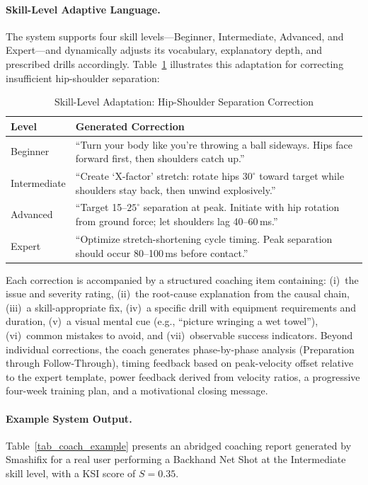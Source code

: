 \documentclass[pdflatex,sn-mathphys-num]{sn-jnl}
\theoremstyle{thmstyleone}%
\theoremstyle{thmstyletwo}%
\theoremstyle{thmstylethree}%
\begin{document}
\paragraph{Skill-Level Adaptive Language.}
The system supports four skill levels---Beginner, Intermediate, Advanced, and Expert---and dynamically adjusts its vocabulary, explanatory depth, and prescribed drills accordingly. Table~\ref{tab_skill_adapt} illustrates this adaptation for correcting insufficient hip-shoulder separation:

\begin{table}[h]
\caption{Skill-Level Adaptation: Hip-Shoulder Separation Correction}\label{tab_skill_adapt}
\centering
\small
\setlength{\tabcolsep}{4pt}
\renewcommand{\arraystretch}{1.3}
\begin{tabular}{|l|p{10.5cm}|}
\hline
\textbf{Level} & \textbf{Generated Correction} \\
\hline
Beginner & ``Turn your body like you're throwing a ball sideways. Hips face forward first, then shoulders catch up.'' \\
\hline
Intermediate & ``Create `X-factor' stretch: rotate hips $30^{\circ}$ toward target while shoulders stay back, then unwind explosively.'' \\
\hline
Advanced & ``Target 15--$25^{\circ}$ separation at peak. Initiate with hip rotation from ground force; let shoulders lag 40--60\,ms.'' \\
\hline
Expert & ``Optimize stretch-shortening cycle timing. Peak separation should occur 80--100\,ms before contact.'' \\
\hline
\end{tabular}
\end{table}

Each correction is accompanied by a structured coaching item containing: (i)~the issue and severity rating, (ii)~the root-cause explanation from the causal chain, (iii)~a skill-appropriate fix, (iv)~a specific drill with equipment requirements and duration, (v)~a visual mental cue (e.g., ``picture wringing a wet towel''), (vi)~common mistakes to avoid, and (vii)~observable success indicators. Beyond individual corrections, the coach generates phase-by-phase analysis (Preparation through Follow-Through), timing feedback based on peak-velocity offset relative to the expert template, power feedback derived from velocity ratios, a progressive four-week training plan, and a motivational closing message.

\paragraph{Example System Output.}
Table~\ref{tab_coach_example} presents an abridged coaching report generated by Smashifix for a real user performing a Backhand Net Shot at the Intermediate skill level, with a KSI score of $S = 0.35$.
\end{document}
